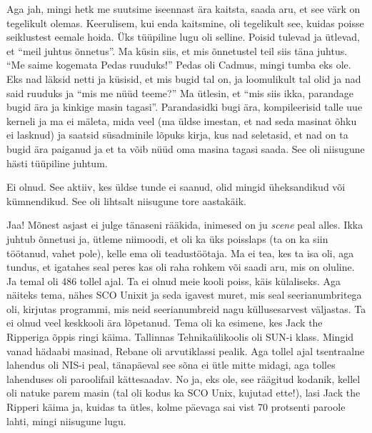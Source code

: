 Aga jah, mingi hetk me suutsime iseennast ära kaitsta, saada aru, et see värk on tegelikult olemas. Keerulisem, kui enda kaitsmine, oli tegelikult see, kuidas poisse seiklustest eemale hoida. Üks tüüpiline lugu oli selline. Poisid tulevad ja ütlevad, et \enquote{meil juhtus õnnetus}. Ma küsin siis, et mis õnnetustel teil siis täna juhtus. \enquote{Me saime kogemata Pedas ruuduks!} Pedas oli Cadmus, mingi tumba  eks ole. Eks nad läksid netti ja küsisid, et mis bugid tal on, ja loomulikult tal olid ja  nad said ruuduks ja \enquote{mis me nüüd teeme?} Ma ütlesin, et \enquote{mis siis ikka, parandage bugid ära ja kinkige masin tagasi}. Parandasidki bugi ära, kompileerisid talle uue kerneli ja ma ei mäleta, mida veel (ma üldse imestan, et nad seda masinat õhku ei lasknud) ja saatsid süsadminile lõpuks kirja, kus nad seletasid, et nad on ta bugid ära paiganud ja et ta võib nüüd oma masina tagasi saada. See oli niisugune hästi tüüpiline juhtum.


Ei olnud. See aktiiv, kes üldse tunde ei saanud, olid mingid üheksandikud või kümnendikud. See oli lihtsalt niisugune tore aastakäik. 


Jaa! Mõnest asjast ei julge tänaseni rääkida, inimesed on ju \emph{scene} peal alles. Ikka juhtub õnnetusi ja, ütleme niimoodi, et oli ka üks poisslaps (ta on ka siin töötanud, vahet pole), kelle ema oli teadustöötaja.  Ma ei tea, kes ta isa oli, aga tundus, et igatahes seal peres kas oli raha rohkem või saadi aru, mis on oluline.  Ja temal oli 486 tollel ajal. Ta ei olnud meie kooli poiss,  käis külaliseks. Aga näiteks tema, nähes SCO Unixit ja seda igavest muret, mis seal seerianumbritega oli, kirjutas programmi, mis neid seerianumbreid nagu küllusesarvest väljastas. Ta ei olnud veel keskkooli ära lõpetanud. Tema oli ka esimene,  kes Jack the Ripperiga õppis ringi käima. Tallinnas Tehnikaülikoolis oli SUN-i klass. Mingid vanad hädaabi masinad, Rebane oli arvutiklassi pealik. Aga tollel ajal tsentraalne lahendus oli NIS-i peal, tänapäeval see sõna ei ütle mitte midagi, aga tolles lahenduses oli paroolifail kättesaadav. No ja, eks ole, see räägitud kodanik, kellel oli natuke parem masin (tal oli kodus ka SCO Unix, kujutad ette!), lasi Jack the Ripperi käima ja, kuidas ta ütles,  kolme päevaga sai vist 70 protsenti paroole lahti, mingi niisugune lugu. 

